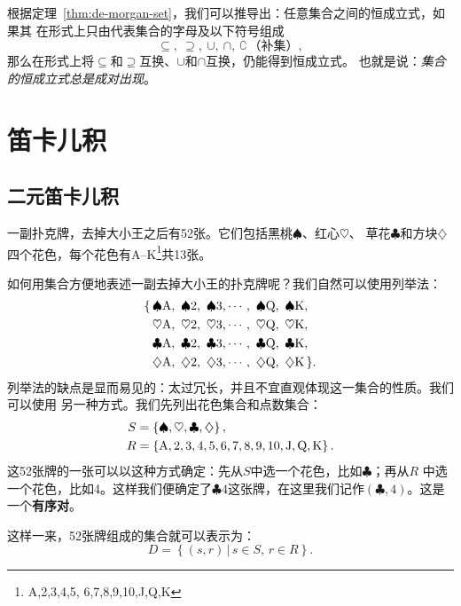根据定理~\ref{thm:de-morgan-set}，我们可以推导出：任意集合之间的恒成立式，如果其
在形式上只由代表集合的字母及以下符号组成
\[
    \subseteq,\ \supseteq,\ \cup,\ \cap,\ \complement\,\text{（补集）},
\]
那么在形式上将$\subseteq$和$\supseteq$互换、$\cup$和$\cap$互换，仍能得到恒成立式。
也就是说：\emph{集合的恒成立式总是成对出现}。

\section{笛卡儿积}

\subsection{二元笛卡儿积}

一副扑克牌，去掉大小王之后有52张。它们包括黑桃$\spadesuit$、红心$\heartsuit$、
草花$\clubsuit$和方块$\diamondsuit$四个花色，每个花色有A--K\footnote{A,2,3,4,5,%
6,7,8,9,10,J,Q,K}共13张。

如何用集合方便地表述一副去掉大小王的扑克牌呢？我们自然可以使用列举法：
\begin{align*}
    \{\, &\spadesuit \ace,\ \spadesuit 2,\ \spadesuit 3,\cdots,\ \spadesuit \queen,\ 
    \spadesuit \king, \\
       &\heartsuit \ace,\ \heartsuit 2,\ \heartsuit 3,\cdots,\ \heartsuit \queen,\ 
    \heartsuit \king, \\
       &\clubsuit \ace,\ \clubsuit 2,\ \clubsuit 3,\cdots,\ \clubsuit \queen,\ 
    \clubsuit \king, \\
       &\diamondsuit \ace,\ \diamondsuit 2,\ \diamondsuit 3,\cdots,\ \diamondsuit \queen,\ 
    \diamondsuit \king\, \}.
\end{align*}
列举法的缺点是显而易见的：太过冗长，并且不宜直观体现这一集合的性质。我们可以使用
另一种方式。我们先列出花色集合和点数集合：
\begin{align*}
    S &= \left\{ \spadesuit,\heartsuit,\clubsuit,\diamondsuit \right\},\\
    R &= \left\{ \text{A},2,3,4,5,6,7,8,9,10,\text{J},\text{Q},\text{K} \right\}.
\end{align*}
这52张牌的一张可以以这种方式确定：先从$S$中选一个花色，比如$\clubsuit$；再从$R$
中选一个花色，比如4。这样我们便确定了$\clubsuit 4$这张牌，在这里我们记作$\left( 
\clubsuit, 4\right) $。这是一个\textbf{有序对}\index{有序对}。

这样一来，52张牌组成的集合就可以表示为：
\[
    D = \left\{ \left( s,r \right) \,|\, s\in S,\, r\in R \right\}.
\]

